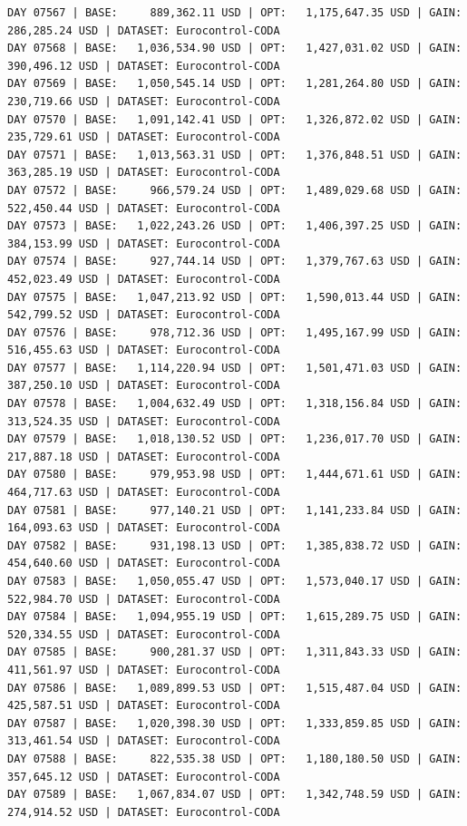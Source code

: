 \documentclass[11pt,a4paper]{article}
\begin{document}
\begin{verbatim}
DAY 07567 | BASE:     889,362.11 USD | OPT:   1,175,647.35 USD | GAIN: 286,285.24 USD | DATASET: Eurocontrol-CODA
DAY 07568 | BASE:   1,036,534.90 USD | OPT:   1,427,031.02 USD | GAIN: 390,496.12 USD | DATASET: Eurocontrol-CODA
DAY 07569 | BASE:   1,050,545.14 USD | OPT:   1,281,264.80 USD | GAIN: 230,719.66 USD | DATASET: Eurocontrol-CODA
DAY 07570 | BASE:   1,091,142.41 USD | OPT:   1,326,872.02 USD | GAIN: 235,729.61 USD | DATASET: Eurocontrol-CODA
DAY 07571 | BASE:   1,013,563.31 USD | OPT:   1,376,848.51 USD | GAIN: 363,285.19 USD | DATASET: Eurocontrol-CODA
DAY 07572 | BASE:     966,579.24 USD | OPT:   1,489,029.68 USD | GAIN: 522,450.44 USD | DATASET: Eurocontrol-CODA
DAY 07573 | BASE:   1,022,243.26 USD | OPT:   1,406,397.25 USD | GAIN: 384,153.99 USD | DATASET: Eurocontrol-CODA
DAY 07574 | BASE:     927,744.14 USD | OPT:   1,379,767.63 USD | GAIN: 452,023.49 USD | DATASET: Eurocontrol-CODA
DAY 07575 | BASE:   1,047,213.92 USD | OPT:   1,590,013.44 USD | GAIN: 542,799.52 USD | DATASET: Eurocontrol-CODA
DAY 07576 | BASE:     978,712.36 USD | OPT:   1,495,167.99 USD | GAIN: 516,455.63 USD | DATASET: Eurocontrol-CODA
DAY 07577 | BASE:   1,114,220.94 USD | OPT:   1,501,471.03 USD | GAIN: 387,250.10 USD | DATASET: Eurocontrol-CODA
DAY 07578 | BASE:   1,004,632.49 USD | OPT:   1,318,156.84 USD | GAIN: 313,524.35 USD | DATASET: Eurocontrol-CODA
DAY 07579 | BASE:   1,018,130.52 USD | OPT:   1,236,017.70 USD | GAIN: 217,887.18 USD | DATASET: Eurocontrol-CODA
DAY 07580 | BASE:     979,953.98 USD | OPT:   1,444,671.61 USD | GAIN: 464,717.63 USD | DATASET: Eurocontrol-CODA
DAY 07581 | BASE:     977,140.21 USD | OPT:   1,141,233.84 USD | GAIN: 164,093.63 USD | DATASET: Eurocontrol-CODA
DAY 07582 | BASE:     931,198.13 USD | OPT:   1,385,838.72 USD | GAIN: 454,640.60 USD | DATASET: Eurocontrol-CODA
DAY 07583 | BASE:   1,050,055.47 USD | OPT:   1,573,040.17 USD | GAIN: 522,984.70 USD | DATASET: Eurocontrol-CODA
DAY 07584 | BASE:   1,094,955.19 USD | OPT:   1,615,289.75 USD | GAIN: 520,334.55 USD | DATASET: Eurocontrol-CODA
DAY 07585 | BASE:     900,281.37 USD | OPT:   1,311,843.33 USD | GAIN: 411,561.97 USD | DATASET: Eurocontrol-CODA
DAY 07586 | BASE:   1,089,899.53 USD | OPT:   1,515,487.04 USD | GAIN: 425,587.51 USD | DATASET: Eurocontrol-CODA
DAY 07587 | BASE:   1,020,398.30 USD | OPT:   1,333,859.85 USD | GAIN: 313,461.54 USD | DATASET: Eurocontrol-CODA
DAY 07588 | BASE:     822,535.38 USD | OPT:   1,180,180.50 USD | GAIN: 357,645.12 USD | DATASET: Eurocontrol-CODA
DAY 07589 | BASE:   1,067,834.07 USD | OPT:   1,342,748.59 USD | GAIN: 274,914.52 USD | DATASET: Eurocontrol-CODA

\end{verbatim}
\end{document}

